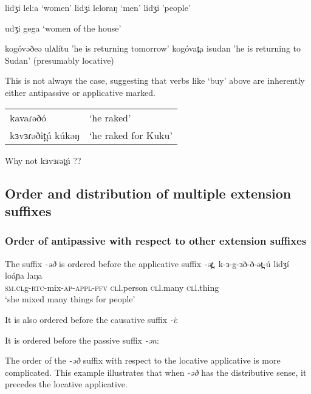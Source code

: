 lidʒi lel:a `women'
lidʒi leloraŋ `men'
lidʒi 'people'

udʒi gega `women of the house'


kogóvəðeə ulʌlítu 	'he is returning tomorrow'
kogóvat̪a isudan 		'he is returning to Sudan' 		(presumably locative)


This is not always the case, suggesting that verbs like `buy' above are inherently either antipassive or applicative marked. 

\begin{tabular}[t]{ll}
kavaɾəðó			&	‘he raked’\\
kɜvɜɾəðit̪ú kúkəŋ	&	‘he raked for Kuku’\\
\end{tabular}

Why not kɜvɜɾət̪ú ??




\subsection{Order and distribution of multiple extension suffixes}\label{sec:ch11:extorder}

\subsubsection{Order of antipassive with respect to other extension suffixes}\label{sec:ch11:antipassiveorder}

The suffix \textit{-əð} is ordered before the applicative suffix \textit{-ət̪}.
\ea
\gll k-ɜ-g-ɜð-ð-ət̪-ú 			lidʒí 		loáɲa 		laŋa\\
\textsc{sm.cl}g-\textsc{rtc}-mix-\textsc{ap-appl-\textsc{pfv}}	\textsc{cl}l.person	\textsc{cl}l.many	\textsc{cl}l.thing		\\
\trans ‘she mixed many things for people’\\
\z



It is also ordered before the causative suffix \textit{-i}:


It is ordered before the passive suffix \textit{-ən}:


The order of the \textit{-əð} suffix with respect to the locative applicative is more complicated. This example illustrates that when \textit{-əð} has the distributive sense, it precedes the locative applicative.


